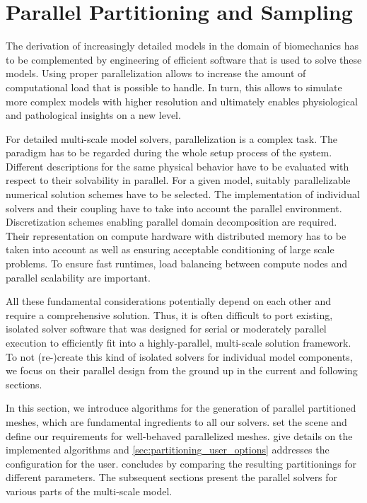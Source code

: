 \section{Parallel Partitioning and Sampling}\label{sec:parallel_partitioning_and_sampling_of_the}


The derivation of increasingly detailed models in the domain of biomechanics has to be complemented by engineering of efficient software that is used to solve these models. Using proper parallelization allows to increase the amount of computational load that is possible to handle. In turn, this allows to simulate more complex models with higher resolution and ultimately enables physiological and pathological insights on a new level.

For detailed multi-scale model solvers, parallelization is a complex task. 
The paradigm has to be regarded  during the whole setup process of the system. Different descriptions for the same physical behavior have to be evaluated with respect to their solvability in parallel. For a given model, suitably parallelizable numerical solution schemes have to be selected. The implementation of individual solvers and their coupling have to take into account the parallel environment. 
Discretization schemes enabling parallel domain decomposition are required. Their representation on compute hardware with distributed memory has to be taken into account as well as ensuring acceptable conditioning of large scale problems. To ensure fast runtimes, load balancing between compute nodes and parallel scalability are important.

All these fundamental considerations potentially depend on each other and require a comprehensive solution. 
Thus, it is often difficult to port existing, isolated solver software that was designed for serial or moderately parallel execution to efficiently fit into a highly-parallel, multi-scale solution framework. To not (re-)create this kind of isolated solvers for individual model components, we focus on their parallel design from the ground up in the current and following sections.

In this section, we introduce algorithms for the generation of parallel partitioned meshes, which are fundamental ingredients to all our solvers.  set the scene and define our requirements for well-behaved parallelized meshes.  give details on the implemented algorithms and \cref{sec:partitioning_user_options} addresses the configuration for the user.  concludes by comparing the resulting partitionings for different parameters.
The subsequent sections present the parallel solvers for various parts of the multi-scale model.


